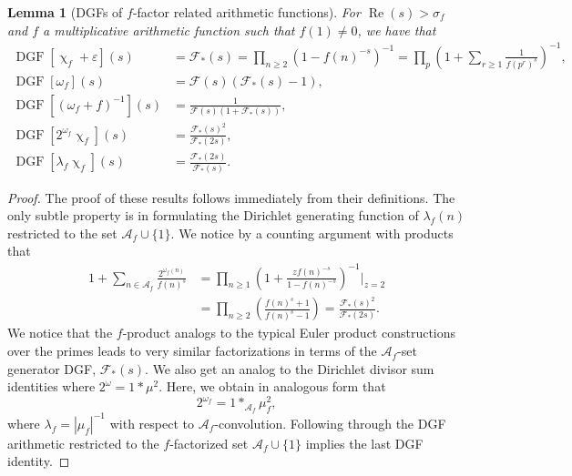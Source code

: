 \documentclass[11pt,reqno,a4letter]{article}
\numberwithin{figure}{section}
\numberwithin{table}{section}
\renewcommand{\chi}{\upchi}
\theoremstyle{plain}
\newtheorem{lemma}[theorem]{Lemma}
\numberwithin{theorem}{section}
\theoremstyle{definition}
\renewcommand{\Re}{\operatorname{Re}}
\begin{document}
\begin{lemma}[DGFs of $f$-factor related arithmetic functions]
For $\Re(s) > \sigma_f$ and $f$ a multiplicative arithmetic function 
such that $f(1) \neq 0$, we have that 
\begin{align}
\tag{A}
\operatorname{DGF}[\chi_f + \varepsilon](s) & = \mathcal{F}_{\ast}(s) = 
     \prod_{n \geq 2} \left(1-f(n)^{-s}\right)^{-1} = 
     \prod_p \left( 
     1 + \sum_{r \geq 1} \frac{1}{f(p^r)^s}\right)^{-1}, \\ 
\tag{B}
\operatorname{DGF}[\omega_f](s) & = \mathcal{F}(s) (\mathcal{F}_{\ast}(s) - 1), \\ 
\tag{C}
\operatorname{DGF}[(\omega_f+f)^{-1}](s) & = \frac{1}{\mathcal{F}(s)(1 + \mathcal{F}_{\ast}(s))}, \\ 
\tag{D}
\operatorname{DGF}[2^{\omega_f} \chi_f](s) & = \frac{\mathcal{F}_{\ast}(s)^2}{\mathcal{F}_{\ast}(2s)}, \\ 
\tag{E} 
\operatorname{DGF}[\lambda_f \chi_f](s) & = \frac{\mathcal{F}_{\ast}(2s)}{\mathcal{F}_{\ast}(s)}. 
\end{align}

\end{lemma}
\begin{proof}
The proof of these results follows immediately from their definitions. 
The only subtle property is in formulating the Dirichlet generating function 
of $\lambda_f(n)$ restricted to the set $\mathcal{A}_f \cup \{1\}$. 
We notice by a counting argument with products that 
\begin{align*}
     1 + \sum_{n \in \mathcal{A}_f} \frac{2^{\omega_f(n)}}{f(n)^{s}} & = 
     \prod_{n \geq 1} \left(1 + \frac{z f(n)^{-s}}{1-f(n)^{-s}} 
     \right)^{-1} \Bigr\rvert_{z=2} \\ 
     & = \prod_{n \geq 2} \left(\frac{f(n)^{s}+1}{f(n)^{s}-1}\right) 
     = \frac{\mathcal{F}_{\ast}(s)^2}{\mathcal{F}_{\ast}(2s)}. 
\end{align*}
We notice that the $f$-product analogs to the typical Euler product 
constructions over the primes leads to very similar factorizations in 
terms of the $\mathcal{A}_f$-set generator DGF, $\mathcal{F}_{\ast}(s)$. 
We also get an analog to the Dirichlet divisor sum identities 
where $2^{\omega} = 1 \ast \mu^2$. Here, we obtain in analogous form that 
\[
2^{\omega_f} = 1 \ast_{\mathcal{A}_f} \mu_f^2, 
\]
where $\lambda_f = |\mu_f|^{-1}$ with respect to 
$\mathcal{A}_f$-convolution. Following through the DGF arithmetic 
restricted to the $f$-factorized set $\mathcal{A}_f \cup \{1\}$ 
implies the last DGF identity. 
\end{proof}
\end{document}

